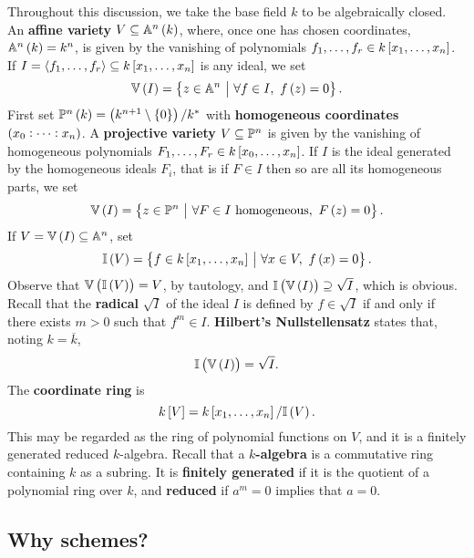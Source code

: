 Throughout this discussion, we take the base field $ k $ to be algebraically closed. An \textbf{affine variety} $ V \subseteq \AA^n\br{k} $, where, once one has chosen coordinates, $ \AA^n\br{k} = k^n $, is given by the vanishing of polynomials $ f_1, \dots, f_r \in k\sbr{x_1, \dots, x_n} $. If $ I = \abr{f_1, \dots, f_r} \subseteq k\sbr{x_1, \dots, x_n} $ is any ideal, we set
$$ \VV\br{I} = \cbr{z \in \AA^n \st \forall f \in I, \ f\br{z} = 0}. $$
First set $ \PP^n\br{k} = \br{k^{n + 1} \setminus \cbr{0}} / k^* $ with \textbf{homogeneous coordinates} $ \br{x_0 : \dots : x_n} $. A \textbf{projective variety} $ V \subseteq \mathbb{P}^n $ is given by the vanishing of homogeneous polynomials $ F_1, \dots, F_r \in k\sbr{x_0, \dots, x_n} $. If $ I $ is the ideal generated by the homogeneous ideals $ F_i $, that is if $ F \in I $ then so are all its homogeneous parts, we set
$$ \VV\br{I} = \cbr{z \in \PP^n \st \forall F \in I \ \text{homogeneous}, \ F\br{z} = 0}. $$
If $ V = \VV\br{I} \subseteq \AA^n $, set
$$ \II\br{V} = \cbr{f \in k\sbr{x_1, \dots, x_n} \st \forall x \in V, \ f\br{x} = 0}. $$
Observe that $ \VV\br{\II\br{V}} = V $, by tautology, and $ \II\br{\VV\br{I}} \supseteq \sqrt{I} $, which is obvious. Recall that the \textbf{radical} $ \sqrt{I} $ of the ideal $ I $ is defined by $ f \in \sqrt{I} $ if and only if there exists $ m > 0 $ such that $ f^m \in I $. \textbf{Hilbert's Nullstellensatz} states that, noting $ k = \overline{k} $,
$$ \II\br{\VV\br{I}} = \sqrt{I}. $$
The \textbf{coordinate ring} is
$$ k\sbr{V} = k\sbr{x_1, \dots, x_n} / \II\br{V}. $$
This may be regarded as the ring of polynomial functions on $ V $, and it is a finitely generated reduced $ k $-algebra. Recall that a \textbf{$ k $-algebra} is a commutative ring containing $ k $ as a subring. It is \textbf{finitely generated} if it is the quotient of a polynomial ring over $ k $, and \textbf{reduced} if $ a^m = 0 $ implies that $ a = 0 $.

\subsection{Why schemes?}


